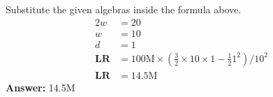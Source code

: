 Substitute the given algebras inside the formula above.
\begin{align*}
2w &= 20 \\
w &= 10 \\
d  &= 1 \\
\textbf{LR} &= 100\text{M} \times (\frac{3}{2}\times 10 \times 1 - \frac{1}{2}1^2) / 10^2 \\
\textbf{LR} &= 14.5\text{M}
\end{align*}
\textbf{Answer:} 14.5M
